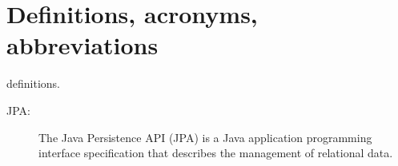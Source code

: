 \section{Definitions, acronyms, abbreviations}
definitions.
\begin{description}
    \item[JPA:] The Java Persistence API (JPA) is a Java application programming interface specification that describes the management of relational data.
\end{description}
